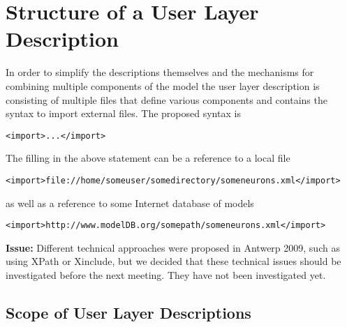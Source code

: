 \documentclass{article}
\newcommand{\issue}[1]{%
\begin{center}
\colorbox{issuecolor}{\parbox{0.8\linewidth}{\textbf{Issue:} #1}}
\end{center}%
}
\begin{document}
\section{Structure of a User Layer Description}

In order to simplify the descriptions themselves and the mechanisms for
combining multiple components of the model the user layer description
is consisting of multiple files that define various components and
contains the syntax to import external files. The proposed syntax is
\begin{verbatim}
<import>...</import>
\end{verbatim}
The filling in the above statement can be a reference to a local file
\begin{verbatim}
<import>file://home/someuser/somedirectory/someneurons.xml</import>
\end{verbatim}
as well as a reference to some Internet database of models
\begin{verbatim}
<import>http://www.modelDB.org/somepath/someneurons.xml</import>
\end{verbatim}

\issue{Different technical approaches were proposed in Antwerp 2009, such as
using XPath or Xinclude, but we decided that these technical issues should
be investigated before the next meeting. They have not been investigated yet.}

\subsection{Scope of User Layer Descriptions}
\label{scope}
\end{document}
